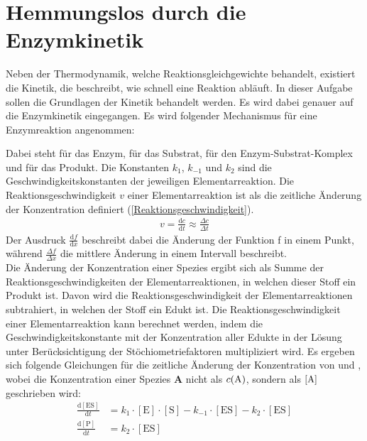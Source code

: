 \documentclass[../kl11.tex]{subfiles}
\begin{document}
\section{Hemmungslos durch die Enzymkinetik}
Neben der Thermodynamik, welche Reaktionsgleichgewichte behandelt, existiert die Kinetik, die beschreibt, wie schnell eine Reaktion abläuft. In dieser Aufgabe sollen die Grundlagen der Kinetik behandelt werden. Es wird dabei genauer auf die Enzymkinetik eingegangen. Es wird folgender Mechanismus für eine Enzymreaktion angenommen:
\begin{center}
\end{center}
Dabei steht \textbf{} für das Enzym, \textbf{} für das Substrat, \textbf{} für den Enzym-Substrat-Komplex und \textbf{} für das Produkt.
Die Konstanten $k_1$, $k_{-1}$ und $k_2$ sind die Geschwindigkeitskonstanten der jeweiligen Elementarreaktion. Die Reaktionsgeschwindigkeit $v$ einer Elementarreaktion ist als die zeitliche Änderung der Konzentration definiert (\autoref{Reaktionsgeschwindigkeit}).
\begin{align}\label{Reaktionsgeschwindigkeit}
v = \frac{\mathrm{d}c}{\mathrm{d}t} \approx \frac{\Delta c}{\Delta t}
\end{align}
Der Ausdruck $\displaystyle\frac{\mathrm{d}f}{\mathrm{d}x}$ beschreibt dabei die Änderung der Funktion f in einem Punkt, während $\displaystyle\frac{\Delta f}{\Delta x}$ die mittlere Änderung in einem Intervall beschreibt. \\
Die Änderung der Konzentration einer Spezies ergibt sich als Summe der Reaktionsgeschwindigkeiten der Elementarreaktionen, in welchen dieser Stoff ein Produkt ist. Davon wird die Reaktionsgeschwindigkeit der Elementarreaktionen subtrahiert, in welchen der Stoff ein Edukt ist. Die Reaktionsgeschwindigkeit einer Elementarreaktion kann berechnet werden, indem die Geschwindigkeitskonstante mit der Konzentration aller Edukte in der Lösung unter Berücksichtigung der Stöchiometriefaktoren multipliziert wird. Es ergeben sich folgende Gleichungen für die zeitliche Änderung der Konzentration von \textbf{} und \textbf{}, wobei die Konzentration einer Spezies \textbf{A} nicht als $c(\ce{A})$, sondern als $[\ce{A}]$ geschrieben wird:
\begin{align}
\frac{\mathrm{d}[\mathrm{ES}]}{\mathrm{d}t} &= k_1 \cdot [\mathrm{E}]\cdot [\mathrm{S}] - k_{-1}\cdot[\mathrm{ES}] - k_2\cdot[\mathrm{ES}] \label{Konzentrationsänderung [ES]}\\
\frac{\mathrm{d}[\mathrm{P}]}{\mathrm{d}t} &= k_2\cdot[\mathrm{ES}] \label{Konzentrationsänderung [P]}
\end{align}
\end{document}
